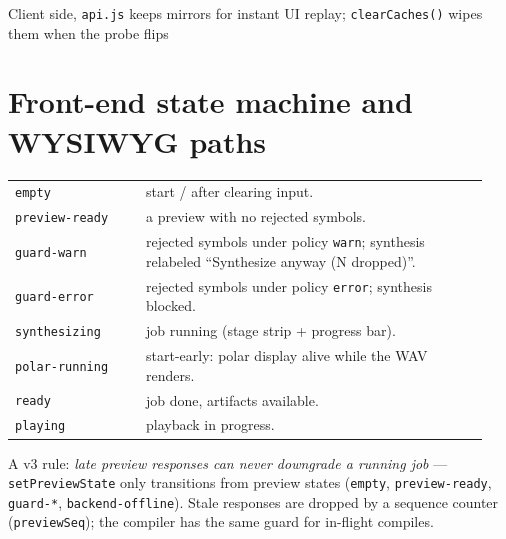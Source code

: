 \documentclass[11pt,a4paper]{article}
\begin{document}
Client side, \texttt{api.js} keeps mirrors for instant UI replay;
\texttt{clearCaches()} wipes them when the probe flips

\section{Front-end state machine and WYSIWYG paths}

\begin{longtable}{p{0.26\linewidth}p{0.68\linewidth}}
\texttt{empty} & start / after clearing input. \\
\texttt{preview-ready} & a preview with no rejected symbols. \\
\texttt{guard-warn} & rejected symbols under policy \texttt{warn};
synthesis relabeled ``Synthesize anyway (N dropped)''. \\
\texttt{guard-error} & rejected symbols under policy \texttt{error};
synthesis blocked. \\
\texttt{synthesizing} & job running (stage strip + progress bar). \\
\texttt{polar-running} & start-early: polar display alive while the WAV
renders. \\
\texttt{ready} & job done, artifacts available. \\
\texttt{playing} & playback in progress. \\
\end{longtable}

A v3 rule: \emph{late preview responses can never downgrade a running
job} --- \texttt{setPreviewState} only transitions from preview states
(\texttt{empty}, \texttt{preview-ready}, \texttt{guard-*},
\texttt{backend-offline}). Stale responses are dropped by a sequence
counter (\texttt{previewSeq}); the compiler has the same guard for
in-flight compiles.
\end{document}
